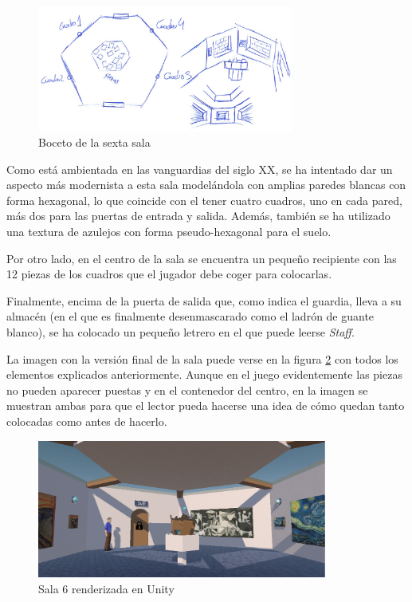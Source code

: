 \begin{figure}[!h]
\begin{center}
\includegraphics[width=0.75\textwidth]{imagenes/7/bocetos/boceto-sala-6.png}
\caption{Boceto de la sexta sala}
\label{fig:boceto-sala-6}
\end{center}
\end{figure}

Como está ambientada en las vanguardias del siglo XX, se ha intentado dar un aspecto más modernista a esta sala modelándola con amplias paredes blancas con forma hexagonal, lo que coincide con el tener cuatro cuadros, uno en cada pared, más dos para las puertas de entrada y salida. Además, también se ha utilizado una textura de azulejos con forma pseudo-hexagonal para el suelo. 

Por otro lado, en el centro de la sala se encuentra un pequeño recipiente con las 12 piezas de los cuadros que el jugador debe coger para colocarlas.

Finalmente, encima de la puerta de salida que, como indica el guardia, lleva a su almacén (en el que es finalmente desenmascarado como el ladrón de guante blanco), se ha colocado un pequeño letrero en el que puede leerse \textit{Staff}.

La imagen con la versión final de la sala puede verse en la figura \ref{fig:unity-sala-6} con todos los elementos explicados anteriormente. Aunque en el juego evidentemente las piezas no pueden aparecer puestas y en el contenedor del centro, en la imagen se muestran ambas para que el lector pueda hacerse una idea de cómo quedan tanto colocadas como antes de hacerlo.

\begin{figure}[!h]
\begin{center}
\includegraphics[width=0.85\textwidth]{imagenes/7/salas-unity/unity-sala-6.png}
\caption{Sala 6 renderizada en Unity}
\label{fig:unity-sala-6}
\end{center}
\end{figure}

